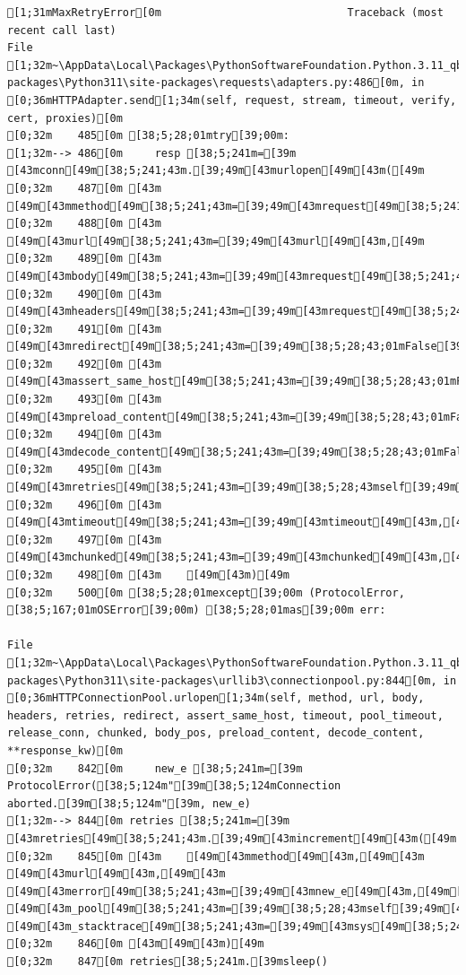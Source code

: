 \documentclass[
  letterpaper,
]{book}
\begin{document}
\begin{verbatim}
[1;31mMaxRetryError[0m                             Traceback (most recent call last)
File [1;32m~\AppData\Local\Packages\PythonSoftwareFoundation.Python.3.11_qbz5n2kfra8p0\LocalCache\local-packages\Python311\site-packages\requests\adapters.py:486[0m, in [0;36mHTTPAdapter.send[1;34m(self, request, stream, timeout, verify, cert, proxies)[0m
[0;32m    485[0m [38;5;28;01mtry[39;00m:
[1;32m--> 486[0m     resp [38;5;241m=[39m [43mconn[49m[38;5;241;43m.[39;49m[43murlopen[49m[43m([49m
[0;32m    487[0m [43m        [49m[43mmethod[49m[38;5;241;43m=[39;49m[43mrequest[49m[38;5;241;43m.[39;49m[43mmethod[49m[43m,[49m
[0;32m    488[0m [43m        [49m[43murl[49m[38;5;241;43m=[39;49m[43murl[49m[43m,[49m
[0;32m    489[0m [43m        [49m[43mbody[49m[38;5;241;43m=[39;49m[43mrequest[49m[38;5;241;43m.[39;49m[43mbody[49m[43m,[49m
[0;32m    490[0m [43m        [49m[43mheaders[49m[38;5;241;43m=[39;49m[43mrequest[49m[38;5;241;43m.[39;49m[43mheaders[49m[43m,[49m
[0;32m    491[0m [43m        [49m[43mredirect[49m[38;5;241;43m=[39;49m[38;5;28;43;01mFalse[39;49;00m[43m,[49m
[0;32m    492[0m [43m        [49m[43massert_same_host[49m[38;5;241;43m=[39;49m[38;5;28;43;01mFalse[39;49;00m[43m,[49m
[0;32m    493[0m [43m        [49m[43mpreload_content[49m[38;5;241;43m=[39;49m[38;5;28;43;01mFalse[39;49;00m[43m,[49m
[0;32m    494[0m [43m        [49m[43mdecode_content[49m[38;5;241;43m=[39;49m[38;5;28;43;01mFalse[39;49;00m[43m,[49m
[0;32m    495[0m [43m        [49m[43mretries[49m[38;5;241;43m=[39;49m[38;5;28;43mself[39;49m[38;5;241;43m.[39;49m[43mmax_retries[49m[43m,[49m
[0;32m    496[0m [43m        [49m[43mtimeout[49m[38;5;241;43m=[39;49m[43mtimeout[49m[43m,[49m
[0;32m    497[0m [43m        [49m[43mchunked[49m[38;5;241;43m=[39;49m[43mchunked[49m[43m,[49m
[0;32m    498[0m [43m    [49m[43m)[49m
[0;32m    500[0m [38;5;28;01mexcept[39;00m (ProtocolError, [38;5;167;01mOSError[39;00m) [38;5;28;01mas[39;00m err:

File [1;32m~\AppData\Local\Packages\PythonSoftwareFoundation.Python.3.11_qbz5n2kfra8p0\LocalCache\local-packages\Python311\site-packages\urllib3\connectionpool.py:844[0m, in [0;36mHTTPConnectionPool.urlopen[1;34m(self, method, url, body, headers, retries, redirect, assert_same_host, timeout, pool_timeout, release_conn, chunked, body_pos, preload_content, decode_content, **response_kw)[0m
[0;32m    842[0m     new_e [38;5;241m=[39m ProtocolError([38;5;124m"[39m[38;5;124mConnection aborted.[39m[38;5;124m"[39m, new_e)
[1;32m--> 844[0m retries [38;5;241m=[39m [43mretries[49m[38;5;241;43m.[39;49m[43mincrement[49m[43m([49m
[0;32m    845[0m [43m    [49m[43mmethod[49m[43m,[49m[43m [49m[43murl[49m[43m,[49m[43m [49m[43merror[49m[38;5;241;43m=[39;49m[43mnew_e[49m[43m,[49m[43m [49m[43m_pool[49m[38;5;241;43m=[39;49m[38;5;28;43mself[39;49m[43m,[49m[43m [49m[43m_stacktrace[49m[38;5;241;43m=[39;49m[43msys[49m[38;5;241;43m.[39;49m[43mexc_info[49m[43m([49m[43m)[49m[43m[[49m[38;5;241;43m2[39;49m[43m][49m
[0;32m    846[0m [43m[49m[43m)[49m
[0;32m    847[0m retries[38;5;241m.[39msleep()


\end{verbatim}
\end{document}
